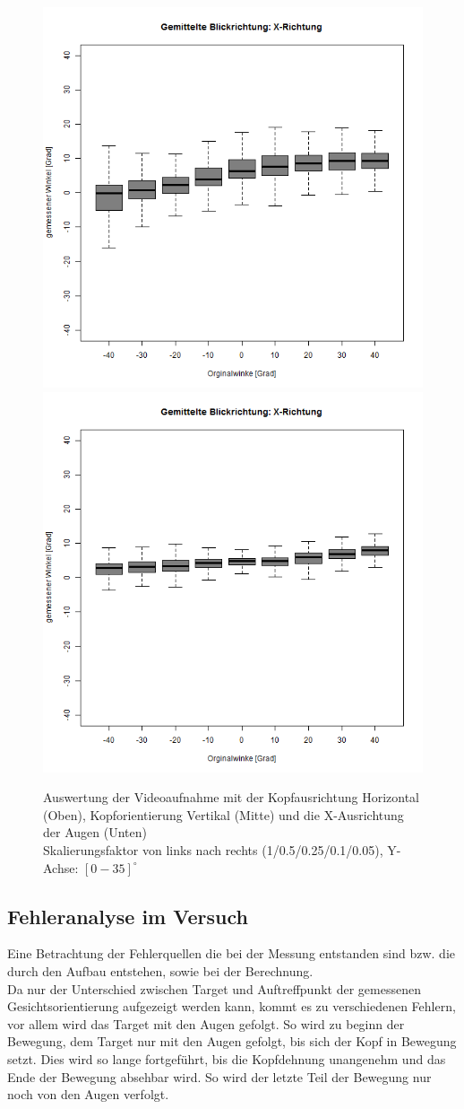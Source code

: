 \begin{landscape}
\begin{figure}
	\includegraphics[width=0.192\linewidth]{OpenFace_Img/EyeAVG_x_S01}
	\includegraphics[width=0.192\linewidth]{OpenFace_Img/EyeAVG_x_S005}
	\caption{Auswertung der Videoaufnahme mit der Kopfausrichtung Horizontal (Oben), Kopforientierung Vertikal (Mitte) und die X-Ausrichtung der Augen (Unten)\\Skalierungsfaktor von links nach rechts (1/0.5/0.25/0.1/0.05), Y-Achse: $[0-35]^\circ$}
	\label{graph_VideoSkalierung}
\end{figure}
\end{landscape}
\subsection{Fehleranalyse im Versuch}
Eine Betrachtung der Fehlerquellen die bei der Messung entstanden sind bzw. die durch den Aufbau entstehen, sowie bei der Berechnung.\\
Da nur der Unterschied zwischen Target und Auftreffpunkt der gemessenen Gesichtsorientierung aufgezeigt werden kann, kommt es zu verschiedenen Fehlern, vor allem wird das Target mit den Augen gefolgt.
So wird zu beginn der Bewegung, dem Target nur mit den Augen gefolgt, bis sich der Kopf in Bewegung setzt. Dies wird so lange fortgeführt, bis die Kopfdehnung unangenehm und das Ende der Bewegung absehbar wird. So wird der letzte Teil der Bewegung nur noch von den Augen verfolgt.
